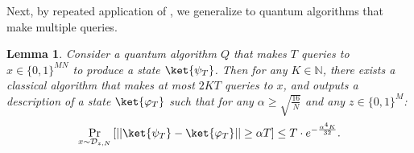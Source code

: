 \documentclass[10pt,a4paper]{article}
\newtheorem{lemma}[theorem]{Lemma}
\newcommand{\Naturals}{\mathbb{N}}
\begin{document}
Next, by repeated application of , we generalize  to quantum algorithms that make multiple queries.

\begin{lemma}
\label{lem:sparse_aaronson_ambainis_states}
Consider a quantum algorithm $Q$ that makes $T$ queries to $x \in \{0,1\}^{MN}$ to produce a state $\ket{\psi_T}$. Then for any $K \in \Naturals$, there exists a classical algorithm that makes at most $2KT$ queries to $x$, and outputs a description of a state $\ket{\varphi_T}$ such that for any $\alpha \ge \sqrt{\frac{16}{N}}$ and any $z \in \{0,1\}^M$:
\[
\Pr_{x \sim \mathcal{D}_{z,N}} \left[|| \ket{\psi_T} - \ket{\varphi_T}|| \ge \alpha T \right] \le T \cdot e^{-\frac{\alpha^4 K}{32}}.
\]
\end{lemma}
\end{document}
